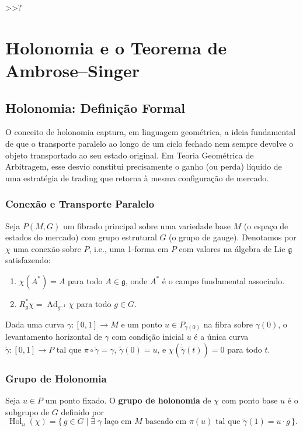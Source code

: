  >>?\chapter{Holonomia e o Teorema de Ambrose--Singer}

\section{Holonomia: Defini\c{c}\~ao Formal}

O conceito de holonomia captura, em linguagem geom\'etrica, a ideia fundamental de que o transporte paralelo ao longo de um ciclo fechado nem sempre devolve o objeto transportado ao seu estado original. Em Teoria Geom\'etrica de Arbitragem, esse desvio constitui precisamente o ganho (ou perda) l\'iquido de uma estrat\'egia de trading que retorna \`a mesma configura\c{c}\~ao de mercado.

\subsection{Conex\~ao e Transporte Paralelo}

Seja \(P(M,G)\) um fibrado principal sobre uma variedade base \(M\) (o espa\c{c}o de estados do mercado) com grupo estrutural \(G\) (o grupo de gauge). Denotamos por \(\chi\) uma conex\~ao sobre \(P\), i.e., uma 1-forma em \(P\) com valores na \'algebra de Lie \(\mathfrak{g}\) satisfazendo:

\begin{enumerate}
 \item \(\chi(A^*) = A\) para todo \(A \in \mathfrak{g}\), onde \(A^*\) \'e o campo fundamental associado.
 \item \(R_g^* \chi = \operatorname{Ad}_{g^{-1}} \chi\) para todo \(g \in G\).
\end{enumerate}

Dada uma curva \(\gamma: [0,1] \to M\) e um ponto \(u \in P_{\gamma(0)}\) na fibra sobre \(\gamma(0)\), o levantamento horizontal de \(\gamma\) com condi\c{c}\~ao inicial \(u\) \'e a \'unica curva \(\tilde{\gamma}: [0,1] \to P\) tal que \(\pi \circ \tilde{\gamma} = \gamma\), \(\tilde{\gamma}(0) = u\), e \(\chi(\dot{\tilde{\gamma}}(t)) = 0\) para todo \(t\).

\subsection{Grupo de Holonomia}

\begin{defi}
Seja \(u \in P\) um ponto fixado. O \textbf{grupo de holonomia} de \(\chi\) com ponto base \(u\) \'e o subgrupo de \(G\) definido por
\begin{equation}\label{eq:hol-group}
 \operatorname{Hol}_u(\chi)
 = \{\, g \in G \mid \exists\; \gamma \text{ la\c{c}o em } M \text{ baseado em } \pi(u) \text{ tal que } \tilde{\gamma}(1) = u \cdot g \,\}.
\end{equation}
\end{defi}

